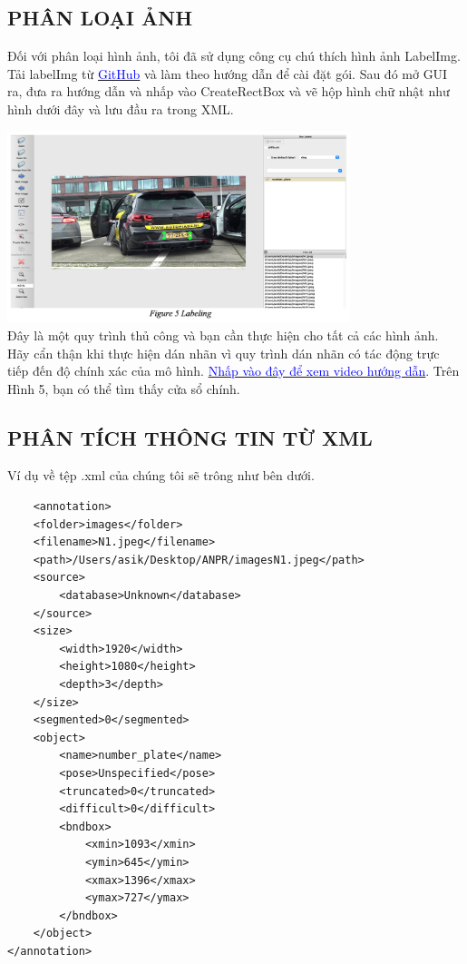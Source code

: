 \documentclass{article}
\begin{document}
\subsection{PHÂN LOẠI ẢNH}

Đối với phân loại hình ảnh, tôi đã sử dụng công cụ chú thích hình ảnh LabelImg. Tải labelImg từ \href{https://github.com/Asikpalysik/Automatic-License-Plate-Detection/tree/main/labelImg-master}{\textcolor{blue}{GitHub}} và làm theo hướng dẫn để cài đặt gói. Sau đó mở GUI ra, đưa ra hướng dẫn và nhấp vào CreateRectBox và vẽ hộp hình chữ nhật như hình dưới đây và lưu đầu ra trong XML.

\includegraphics[width=10cm]{img/img1/Notebook6.png}\\

Đây là một quy trình thủ công và bạn cần thực hiện cho tất cả các hình ảnh. Hãy cẩn thận khi thực hiện dán nhãn vì quy trình dán nhãn có tác động trực tiếp đến độ chính xác của mô hình. \href{https://www.youtube.com/watch?v=XxslbNwcdaI}{\textcolor{blue}{Nhấp vào đây để xem video hướng dẫn}}. Trên Hình 5, bạn có thể tìm thấy cửa sổ chính.

\subsection{PHÂN TÍCH THÔNG TIN TỪ XML}


Ví dụ về tệp .xml của chúng tôi sẽ trông như bên dưới.\\

\begin{verbatim}
    <annotation>
    <folder>images</folder>
    <filename>N1.jpeg</filename>
    <path>/Users/asik/Desktop/ANPR/imagesN1.jpeg</path>
    <source>
        <database>Unknown</database>
    </source>
    <size>
        <width>1920</width>
        <height>1080</height>
        <depth>3</depth>
    </size>
    <segmented>0</segmented>
    <object>
        <name>number_plate</name>
        <pose>Unspecified</pose>
        <truncated>0</truncated>
        <difficult>0</difficult>
        <bndbox>
            <xmin>1093</xmin>
            <ymin>645</ymin>
            <xmax>1396</xmax>
            <ymax>727</ymax>
        </bndbox>
    </object>
</annotation>
\end{verbatim}
\end{document}
